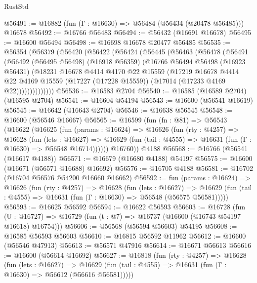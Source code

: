 \begin{lexlean}{RustStd}
\begin{coremodule}
@56491 := @16882 (fun (Γ : @16630) => @56484 (@56434 (@20478 @56485))) @16678
@56492 := @16766 @56483
@56494 := @56432 (@16691 @16678)
@56495 := @16600 @56494
@56498 := @16698 @16678 @20477 @56485
@56535 := @56354
    (@56379
      (@56420
        (@56422
          (@56424
            (@56445
              (@56463
                (@56478
                  (@56491
                    (@56492
                      (@56495 @56498)
                      (@16918 @56359)
                      (@16766
                        @56494
                        @56498
                        (@16923 @56431)
                        (@18231
                          @16678
                          @4414
                          @4170
                          @22
                          @15559
                          (@17219
                            @16678
                            @4414
                            @22
                            @4169
                            @15559
                            (@17227 (@17228 @15559))
                            (@17014 (@17233 @4169 @22))))))))))))))
@56536 := @16583 @2704
@56540 := @16585 (@16589 @2704) (@16595 @2704)
@56541 := @16604 @54194
@56543 := @16600 (@56541 @16619)
@56545 := @16642 (@16643 @2704)
@56546 := @16638 @56545
@56548 := @16600 (@56546 @16667)
@56565 := @16599
    (fun (fn : @81) =>
    @56543
      (@16622
        (@16625
          (fun (params : @16624) =>
          @16626
            (fun (rty : @4257) =>
            @16628
              (fun (lets : @16627) =>
              @16629 (fun (tail : @4555) => @16631 (fun (Γ : @16630) => @56548 @16714))))))
        @16760))
    @4188
@56568 := @16766 (@56541 (@16617 @4188))
@56571 := @16679 (@16680 @4188) @54197
@56575 := @16600 (@16671 (@56571 @16688) @16692)
@56576 := @16705 @4188
@56581 := @16702 (@16704 @56576 @54200 @16660 @16662)
@56592 := fun (params : @16624) =>
  @16626
    (fun (rty : @4257) =>
    @16628
      (fun (lets : @16627) =>
      @16629 (fun (tail : @4555) => @16631 (fun (Γ : @16630) => @56548 (@56575 @56581)))))
@56593 := @16625 @56592
@56594 := @16622 @56593
@56603 := @16728
    (fun (U : @16727) => @16729 (fun (t : @7) => @16737 (@16600 (@16743 @54197 @16618) @16754)))
@56606 := @56568 (@56594 @56603) @54195
@56608 := @16585 @56593 @56603
@56610 := @16815 @56592 @11962
@56612 := @16600 (@56546 @47913)
@56613 := @56571 @47916
@56614 := @16671 @56613
@56616 := @16600 (@56614 @16692)
@56627 := @16818
    (fun (rty : @4257) =>
    @16628
      (fun (lets : @16627) =>
      @16629 (fun (tail : @4555) => @16631 (fun (Γ : @16630) => @56612 (@56616 @56581)))))

\end{coremodule}
\end{lexlean}
